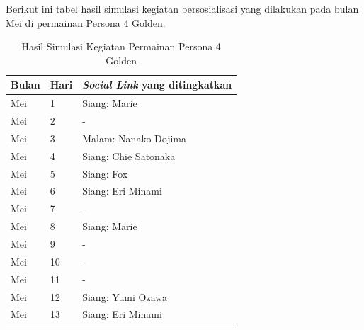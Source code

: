 Berikut ini tabel hasil simulasi kegiatan bersosialisasi yang dilakukan pada bulan Mei di permainan Persona 4 Golden.
\begin{table}[H]
    \caption{\label{simres1}Hasil Simulasi Kegiatan Permainan Persona 4 Golden}
    \begin{center}
        \begin{tabular}{ | p{} | p{} | p{} | }
            \hline
            \textbf{Bulan} & \textbf{Hari} & \textbf{\textit{Social Link} yang ditingkatkan} \\
            \hline
            Mei            & 1             & Siang: Marie                                    \\
            \hline
            Mei            & 2             & -                                               \\
            \hline
            Mei            & 3             & Malam: Nanako Dojima                            \\
            \hline
            Mei            & 4             & Siang: Chie Satonaka                            \\
            \hline
            Mei            & 5             & Siang: Fox                                      \\
            \hline
            Mei            & 6             & Siang: Eri Minami                               \\
            \hline
            Mei            & 7             & -                                               \\
            \hline
            Mei            & 8             & Siang: Marie                                    \\
            \hline
            Mei            & 9             & -                                               \\
            \hline
            Mei            & 10            & -                                               \\
            \hline
            Mei            & 11            & -                                               \\
            \hline
            Mei            & 12            & Siang: Yumi Ozawa                               \\
            \hline
            Mei            & 13            & Siang: Eri Minami                               \\

\end{tabular}
\end{center}
\end{table}
